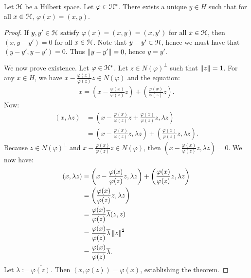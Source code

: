 \begin{theorem}
    Let $\mathcal{H}$ be a Hilbert space. Let $\varphi \in \mathcal{H}^\ast$. There exists a unique $y \in H$ such that for all $x \in \mathcal{H}$, $\varphi(x) = (x,y)$.
\end{theorem}
    \begin{proof}
        If $y,y' \in \mathcal{H}$ satisfy $\varphi(x) = (x,y) = (x,y')$ for all $x \in \mathcal{H}$, then $(x,y-y') = 0$ for all $x \in \mathcal{H}$. Note that $y-y' \in \mathcal{H}$, hence we must have that $(y-y',y-y') = 0$. Thus $\left\lVert y - y' \right\rVert = 0$, hence $y = y'$.

        We now prove existence. Let $\varphi \in \mathcal{H}^\ast$. Let $z \in N(\varphi)^\perp$ such that $\left\lVert z \right\rVert = 1$. For any $x \in H$, we have $x - \frac{\varphi(x)}{\varphi(z)}z \in N(\varphi)$ and the equation:
            \begin{equation*}
            \begin{split}
                x = \left( x - \frac{\varphi(x)}{\varphi(z)}z \right) + \left( \frac{\varphi(x)}{\varphi(z)}z \right).
            \end{split}
            \end{equation*}
        Now:
            \begin{equation*}
            \begin{split}
                (x,\lambda z)
                & = \left( x - \frac{\varphi(x)}{\varphi(z)}z + \frac{\varphi(x)}{\varphi(z)}z, \lambda z \right) \\
                & = \left( x - \frac{\varphi(x)}{\varphi(z)}z, \lambda z \right) + \left( \frac{\varphi(x)}{\varphi(z)}z, \lambda z \right).
            \end{split}
            \end{equation*}
        Because $z \in N(\varphi)^\perp$ and $x - \frac{\varphi(x)}{\varphi(z)}z \in N(\varphi)$, then $\left( x - \frac{\varphi(x)}{\varphi(z)}z, \lambda z \right) = 0$. We now have:
            \begin{equation*}
            \begin{split}
                (x,\lambda z)
                & = \left( x - \frac{\varphi(x)}{\varphi(z)}z, \lambda z \right) + \left( \frac{\varphi(x)}{\varphi(z)}z, \lambda z \right) \\
                & = \left( \frac{\varphi(x)}{\varphi(z)}z, \lambda z \right) \\
                & = \frac{\varphi(x)}{\varphi(z)}\overline{\lambda} (z,z) \\
                & = \frac{\varphi(x)}{\varphi(z)}\overline{\lambda} \left\lVert z \right\rVert^2 \\
                & = \frac{\varphi(x)}{\varphi(z)}\overline{\lambda}.
            \end{split}
            \end{equation*}
        Let $\lambda := \overline{\varphi(z)}$. Then $(x,\varphi(z)) = \varphi(x)$, establishing the theorem.
    \end{proof}

